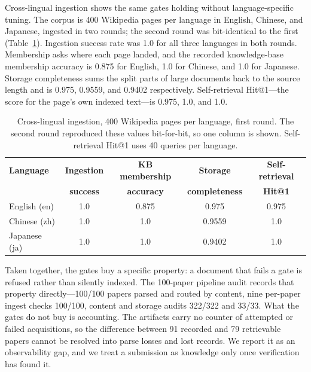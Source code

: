 Cross-lingual ingestion shows the same gates holding without
language-specific tuning. The corpus is 400 Wikipedia pages per
language in English, Chinese, and Japanese, ingested in two rounds; the
second round was bit-identical to the first
(Table~\ref{tab:acq-crosslang}). Ingestion success rate was 1.0 for all
three languages in both rounds. Membership asks where each page landed,
and the recorded knowledge-base membership accuracy is 0.875 for
English, 1.0 for Chinese, and 1.0 for Japanese. Storage completeness sums the
split parts of large documents back to the source length and is 0.975,
0.9559, and 0.9402 respectively. Self-retrieval Hit@1---the score for
the page's own indexed text---is 0.975, 1.0, and 1.0.

\begin{table}[t]
\centering
\caption{Cross-lingual ingestion, 400 Wikipedia pages per language,
first round. The second round reproduced these values bit-for-bit, so
one column is shown. Self-retrieval Hit@1 uses 40 queries per
language.}
\label{tab:acq-crosslang}
\small
\begin{tabular}{@{}lcccc@{}}
\toprule
\textbf{Language} & \textbf{Ingestion} & \textbf{KB membership} & \textbf{Storage} & \textbf{Self-retrieval} \\
 & \textbf{success} & \textbf{accuracy} & \textbf{completeness} & \textbf{Hit@1} \\
\midrule
English (en) & 1.0 & 0.875  & 0.975   & 0.975 \\
Chinese (zh) & 1.0 & 1.0    & 0.9559  & 1.0 \\
Japanese (ja) & 1.0 & 1.0    & 0.9402  & 1.0 \\
\bottomrule
\end{tabular}
\end{table}

Taken together, the gates buy a specific property: a document that
fails a gate is refused rather than silently indexed. The 100-paper
pipeline audit records that property directly---100/100 papers parsed
and routed by content, nine per-paper ingest checks 100/100, content
and storage audits 322/322 and 33/33. What the gates do not buy is
accounting. The artifacts carry no counter of attempted or failed
acquisitions, so the difference between 91 recorded and 79 retrievable
papers cannot be resolved into parse losses and lost records. We report
it as an observability gap, and we treat a submission as knowledge only
once verification has found it.
